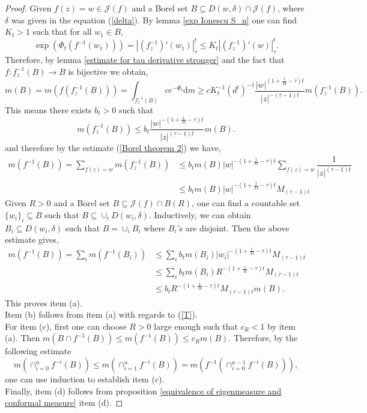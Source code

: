 \documentclass[12pt,reqno]{amsart}
\begin{document}
\begin{proof}
     Given $f(z)=w\in \mathcal{J}(f)$ and a Borel set $B\subseteq D(w,\delta) \cap \mathcal{J}(f)$, where $\delta$ was given in the equation (\ref{delta}). By lemma \ref{exp Ionescu S_n} one can find $K_t>1$ such that for all $w_1\in B,$
     $$\exp\left(\Phi_t\left(f^{-1}(w_1)\right)\right)=\left|(f_z^{-1})'(w_1)\right|_{\tau}^{t}\leq K_t \left|(f_z^{-1})'(w)\right|_{\tau}^{t}.$$
     Therefore, by lemma \ref{estimate for tau derivative stronger} and the fact that $f: f^{-1}_z(B) \to B$ is bijective we obtain,
     $$m(B)=m(f(f^{-1}_z(B)))=\int_{f_z^{-1}(B)}ce^{-\Phi_t}\text{d}m \geq cK_t^{-1}(d^{t})^{-1}\dfrac{|w|^{(1+\frac{1}{M}-\tau)t}}{|z|^{-(\tau-1)t}} m(f_z^{-1}(B)).$$
     This means there exists $b_t>0$ such that 
     $$m(f_z^{-1}(B)) \leq b_t \dfrac{|w|^{-(1+\frac{1}{M}-\tau)t}}{|z|^{(\tau-1)t}} m(B).$$
     and therefore by the estimate (\ref{Borel theorem 2}) we have,
     \begin{align*}
         m(f^{-1}(B))=\sum_{f(z)=w}m(f_z^{-1}(B)) &\leq b_tm(B)|w|^{-(1+\frac{1}{M}-\tau)t}\sum_{f(z)=w}\dfrac{1}{|z|^{(\tau-1)t}}\\
         &\leq  b_tm(B)|w|^{-(1+\frac{1}{M}-\tau)t} M_{(\tau-1)t}
     \end{align*}
     Given $R>0$ and a Borel set $B\subseteq \mathcal{J}(f) \cap B(R)$, one can find a countable set $\{w_i\}_i \subseteq B$ such that 
     $B \subseteq \cup_i D(w_i,\delta)$. Inductively, we can obtain $B_i\subseteq D(w_i,\delta)$ such that $B=\cup_i B_i$ where $B_{i}$'s are disjoint. Then the above estimate gives,
     \begin{align*}
    m\left(f^{-1}(B)\right) = \sum_i m\left(f^{-1}(B_{i})\right) &\leq \sum_i b_t m(B_i)|w_{i}|^{-(1+\frac{1}{M}-\tau)t}M_{(\tau-1)t}\\
    & \leq \sum_i b_tm(B_i)R^{-(1+\frac{1}{M}-\tau)t}M_{(\tau-1)t}\\
    & \leq b_tR^{-(1+\frac{1}{M}-\tau)t}M_{(\tau-1)t}m(B).
     \end{align*}
     This proves item (a).\\
     Item (b) follows from item (a) with regards to (\ref{T}).\\
     For item (c), first one can choose $R>0$ large enough such that $c_R<1$ by item (a). Then $m(B\cap f^{-1}(B))\leq m(f^{-1}(B))\leq c_Rm(B)$. Therefore, by the following estimate
     $$m\left( \cap_{i=0}^nf^{-i}(B)\right) \leq m\left( \cap_{i=1}^nf^{-i}(B)\right)=m\left( f^{-1}\left(\cap_{i=0}^{n-1}f^{-i}(B)\right)\right),$$
     one can use induction to establish item (c).\\
     Finally, item (d) follows from proposition \ref{equivalence of eigenmeasure and conformal measure} item (d).
\end{proof}
\end{document}
